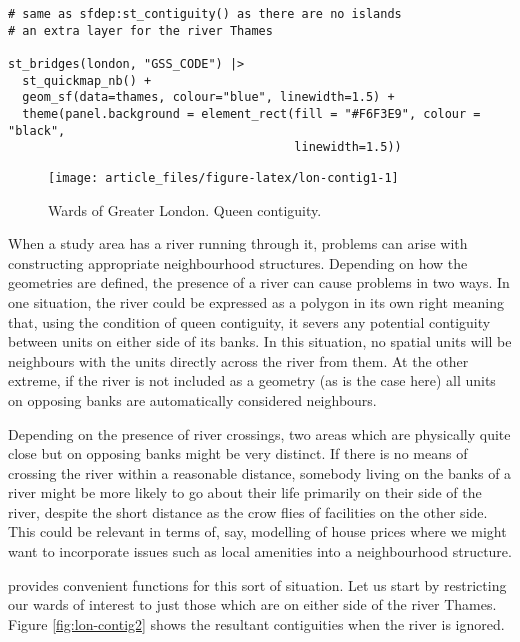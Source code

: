 \begin{verbatim}
# same as sfdep:st_contiguity() as there are no islands
# an extra layer for the river Thames

st_bridges(london, "GSS_CODE") |>
  st_quickmap_nb() +
  geom_sf(data=thames, colour="blue", linewidth=1.5) +
  theme(panel.background = element_rect(fill = "#F6F3E9", colour = "black",
                                        linewidth=1.5))
\end{verbatim}

\begin{figure}

{\centering \texttt{[image: article\_files/figure-latex/lon-contig1-1]} 

}

\caption{Wards of Greater London. Queen contiguity. }\label{fig:lon-contig1}
\end{figure}

When a study area has a river running through it, problems can arise with constructing appropriate neighbourhood structures. Depending on how the
geometries are defined, the presence of a river can cause problems in two ways. In one situation, the river could be expressed as a polygon in its own right meaning that, using the condition of queen contiguity, it severs any potential contiguity between units on either side of its banks. In this situation, no spatial units will be neighbours with the units directly across the river from them. At the other extreme, if the river is not included as a geometry (as is the case here) all units on opposing banks are automatically considered neighbours.

Depending on the presence of river crossings, two areas which are physically quite close but on opposing banks might be very distinct. If there is no means of crossing the river within a reasonable distance, somebody living on the banks of a river might be more likely to go about their life primarily on their side of the river, despite the short distance as the crow flies of facilities on the other side. This could be relevant in terms of, say, modelling of house prices where we might want to incorporate issues such as local amenities into a neighbourhood structure.

 provides convenient functions for this sort of situation. Let us start by restricting our wards of interest to just those which are on either side of the river Thames. Figure \ref{fig:lon-contig2} shows the resultant contiguities when the river is ignored.

